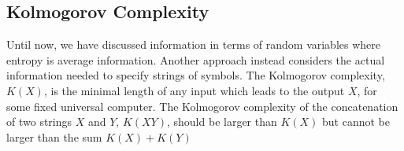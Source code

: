 \subsection{Kolmogorov Complexity}
Until now, we have discussed information in terms of random variables where entropy is average information.  Another approach instead  considers the actual information needed to specify strings of symbols.  The Kolmogorov complexity, $K(X)$, is the minimal length of any input which leads to the output $X$, for some fixed universal computer. The Kolmogorov complexity of the concatenation of two strings $X$ and $Y$, $K(XY)$, should be larger than $K(X)$ but cannot be larger than the sum $K(X)+K(Y)$
%
